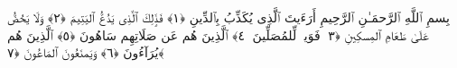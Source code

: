 
  
    
  
    
    

\nopagebreak
  بِسمِ ٱللَّهِ ٱلرَّحمَـٰنِ ٱلرَّحِيمِ
  أَرَءَيتَ ٱلَّذِى يُكَذِّبُ بِٱلدِّينِ ﴿١﴾
 فَذَٟلِكَ ٱلَّذِى يَدُعُّ ٱليَتِيمَ ﴿٢﴾
 وَلَا يَحُضُّ عَلَىٰ طَعَامِ ٱلمِسكِينِ ﴿٣﴾
 فَوَيلٌۭ لِّلمُصَلِّينَ ﴿٤﴾
 ٱلَّذِينَ هُم عَن صَلَاتِهِم سَاهُونَ ﴿٥﴾
 ٱلَّذِينَ هُم يُرَآءُونَ ﴿٦﴾
 وَيَمنَعُونَ ٱلمَاعُونَ ﴿٧﴾
 
